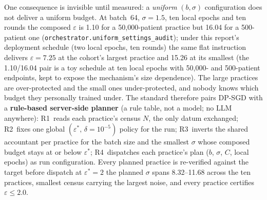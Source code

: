 One consequence is invisible until measured: a \emph{uniform} $(b, \sigma)$ configuration does not
deliver a uniform budget. At batch~64, $\sigma = 1.5$, ten local epochs and ten rounds the composed
$\varepsilon$ is 1.10 for a 50,000-patient practice but 16.04 for a 500-patient one
(\texttt{orchestrator.uniform\_settings\_audit}); under this report's deployment schedule (two local epochs, ten
rounds) the same flat instruction delivers $\varepsilon = 7.25$ at the cohort's largest practice
and 15.26 at its smallest (the 1.10/16.04 pair is a toy schedule at ten local epochs with
50,000- and 500-patient endpoints, kept to expose the mechanism's size dependence). The large practices are over-protected and the small ones under-protected, and nobody
knows which budget they personally trained under. The standard therefore pairs DP-SGD with a
\textbf{rule-based server-side planner} (a rule table, not a model; no LLM anywhere): R1~reads each
practice's census $N$, the only datum exchanged; R2~fixes one global $(\varepsilon^{*},\,
\delta = 10^{-5})$ policy for the run; R3~inverts the shared accountant per practice for the batch
size and the smallest $\sigma$ whose composed budget stays at or below $\varepsilon^{*}$; R4~dispatches
each practice's plan ($b$, $\sigma$, $C$, local epochs) as run configuration. Every planned practice
is re-verified against the target before dispatch at $\varepsilon^{*} = 2$ the planned $\sigma$
spans 8.32--11.68 across the ten practices, smallest census carrying the largest noise, and every
practice certifies $\varepsilon \le 2.0$.

\begin{table}[htbp]
  \centering
  \caption{The deployment standard, measured: record-level DP-SGD inside each practice with
  per-practice $(b, \sigma)$ orchestrated to one target $\varepsilon^{*}$. \NumPractices{} synthetic
  practices, \NumSeeds{} seeds, $R = 10$ rounds, 2 local epochs, $\delta = 10^{-5}$; mean $\pm$ s.d.
  Computed in \texttt{notebooks/03\_dpsgd\_secagg\_standard.ipynb} \S5, quoted verbatim (not from
  this report's macro cache). The no-DP row re-runs the same DP-SGD runner with $\sigma = 0$; the
  published no-DP FedAvg figure (\BestFedAUC{} / \BestFedWorst{}, \S\ref{sec:works}) used the
  full-batch 20-round path and sits about 0.01 higher a per-sample-clipping path difference, present
  at every budget including none, documented in the notebook.}
  
  \label{tab:dpsgdstandard}
\end{table}

